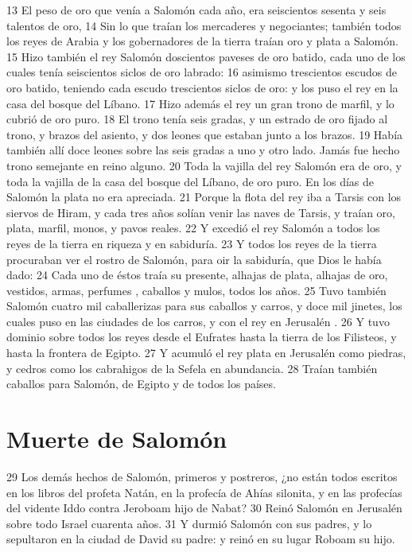 13 El peso de oro que venía a Salomón cada año, era seiscientos sesenta y seis talentos de oro,
14 Sin lo que traían los mercaderes y negociantes; también todos los reyes de Arabia y los gobernadores de la tierra traían oro y plata a Salomón.
15 Hizo también el rey Salomón doscientos paveses de oro batido, cada uno de los cuales tenía seiscientos siclos de oro   labrado:
16 asimismo trescientos escudos de oro batido, teniendo cada escudo trescientos siclos de oro:   y los puso el rey en la casa del bosque del Líbano.
17 Hizo además el rey un gran trono de marfil, y lo cubrió de oro puro.
18 El trono tenía seis gradas, y un estrado de oro fijado al trono, y brazos del asiento, y dos leones que estaban junto a los brazos.
19 Había también allí doce leones sobre las seis gradas a uno y otro lado. Jamás fue hecho trono semejante en reino alguno.
20 Toda la vajilla del rey Salomón era de oro, y toda la vajilla de la casa del bosque del Líbano, de oro puro. En los días de Salomón la plata no era apreciada.
21 Porque la flota del rey iba a Tarsis con los siervos de Hiram, y cada tres años solían venir las naves de Tarsis, y traían oro, plata, marfil, monos, y pavos reales.
22 Y excedió el rey Salomón a todos los reyes de la tierra en riqueza y en sabiduría.
23 Y todos los reyes de la tierra procuraban ver el rostro de Salomón, para oir la sabiduría, que Dios le había dado:
24 Cada uno de éstos traía su presente, alhajas de plata, alhajas de oro, vestidos, armas, perfumes , caballos y mulos, todos los años.
25 Tuvo también Salomón cuatro mil caballerizas para sus caballos y carros, y doce mil jinetes, los cuales puso en las ciudades de los carros, y con el rey en Jerusalén .
26 Y tuvo dominio sobre todos los reyes desde el Eufrates hasta la tierra de los Filisteos, y hasta la frontera de Egipto. 
27 Y acumuló el rey plata en Jerusalén  como piedras, y cedros como los cabrahigos de la Sefela en abundancia.
28 Traían también caballos para Salomón, de Egipto y de todos los países.

\section*{Muerte de Salomón}

29 Los demás hechos de Salomón, primeros y postreros, ¿no están todos escritos en los libros del profeta Natán, en la profecía de Ahías silonita, y en las profecías del vidente Iddo contra Jeroboam hijo de Nabat?
30 Reinó Salomón en Jerusalén  sobre todo Israel cuarenta años.
31 Y durmió Salomón con sus padres, y lo sepultaron en la ciudad de David su padre: y reinó en su lugar Roboam su hijo.

